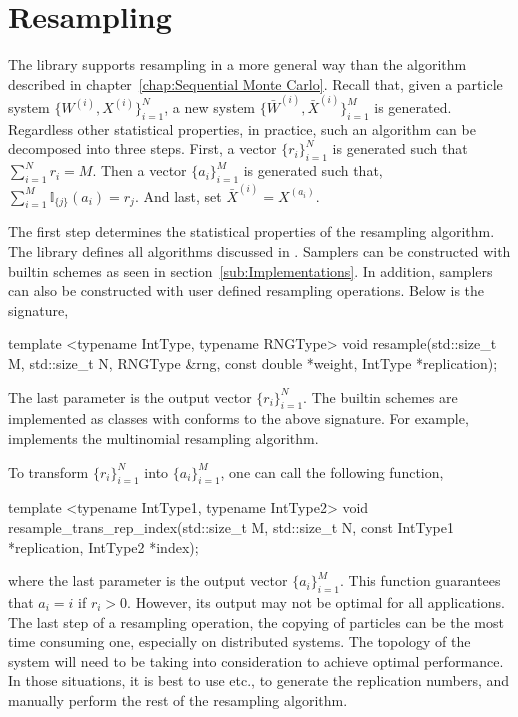\chapter{Resampling}
\label{chap:Resampling}

The library supports resampling in a more general way than the algorithm
described in chapter~\ref{chap:Sequential Monte Carlo}. Recall that, given a
particle system $\{W^{(i)},X^{(i)}\}_{i=1}^N$, a new system $\{\bar{W}^{(i)},
\bar{X}^{(i)}\}_{i=1}^M$ is generated. Regardless other statistical properties,
in practice, such an algorithm can be decomposed into three steps. First, a
vector $\{r_i\}_{i=1}^N$ is generated such that $\sum_{i=1}^N r_i = M$. Then a
vector $\{a_i\}_{i=1}^M$ is generated such that, $\sum_{i=1}^M
\mathbb{I}_{\{j\}}(a_i) = r_j$. And last, set $\bar{X}^{(i)} = X^{(a_i)}$.

The first step determines the statistical properties of the resampling
algorithm. The library defines all algorithms discussed in
\textcite{Douc:2005wa}. Samplers can be constructed with builtin schemes as
seen in section~\ref{sub:Implementations}. In addition, samplers can also be
constructed with user defined resampling operations. Below is the signature,
\begin{cppcode}
  template <typename IntType, typename RNGType>
  void resample(std::size_t M, std::size_t N, RNGType &rng,
  const double *weight, IntType *replication);
\end{cppcode}
The last parameter is the output vector $\{r_i\}_{i=1}^N$. The builtin schemes
are implemented as classes with  conforms to the above
signature. For example,  implements the
multinomial resampling algorithm.

To transform $\{r_i\}_{i=1}^N$ into $\{a_i\}_{i=1}^M$, one can call the
following function,
\begin{cppcode}
  template <typename IntType1, typename IntType2>
  void resample_trans_rep_index(std::size_t M, std::size_t N,
  const IntType1 *replication, IntType2 *index);
\end{cppcode}
where the last parameter is the output vector $\{a_i\}_{i=1}^M$. This function
guarantees that $a_i = i$ if $r_i > 0$. However, its output may not be optimal
for all applications. The last step of a resampling operation, the copying of
particles can be the most time consuming one, especially on distributed
systems. The topology of the system will need to be taking into consideration
to achieve optimal performance. In those situations, it is best to use
 etc., to generate the replication numbers, and
manually perform the rest of the resampling algorithm.

